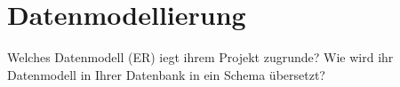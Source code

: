\section{Datenmodellierung}
Welches Datenmodell  (ER) iegt ihrem Projekt zugrunde?
Wie wird  ihr Datenmodell in Ihrer Datenbank in ein Schema übersetzt?